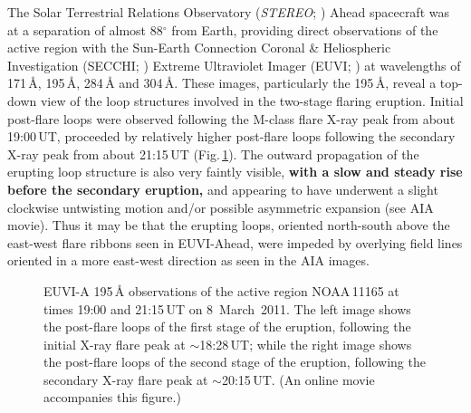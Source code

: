 \documentclass[namedreferences]{solarphysics}
\begin{document}
\begin{article}
The Solar Terrestrial Relations Observatory (\emph{STEREO}; ) Ahead spacecraft was at a separation of almost 88$^{\circ}$ from Earth, providing direct observations of the active region with the Sun-Earth Connection Coronal \& Heliospheric Investigation (SECCHI; ) Extreme Ultraviolet Imager (EUVI; ) at wavelengths of 171\,{\AA}, 195\,{\AA}, 284\,{\AA} and 304\,{\AA}. These images, particularly the 195\,{\AA}, reveal a top-down view of the loop structures involved in the two-stage flaring eruption. Initial post-flare loops were observed following the M-class flare X-ray peak from about 19:00\,UT, proceeded by relatively higher post-flare loops following the secondary X-ray peak from about 21:15\,UT (Fig.\,\ref{euvi}). The outward propagation of the erupting loop structure is also very faintly visible, {\bf with a slow and steady rise before the secondary eruption,} and appearing to have underwent a slight clockwise untwisting motion and/or possible asymmetric expansion (see AIA movie). Thus it may be that the erupting loops, oriented north-south above the east-west flare ribbons seen in EUVI-Ahead, were impeded by overlying field lines oriented in a more east-west direction as seen in the AIA images.

\begin{figure}[!t]
\caption{EUVI-A 195\,{\AA} observations of the active region NOAA\,11165 at times 19:00 and 21:15\,UT on 8~March~2011. The left image shows the post-flare loops of the first stage of the eruption, following the initial X-ray flare peak at $\sim$18:28\,UT; while the right image shows the post-flare loops of the second stage of the eruption, following the secondary X-ray flare peak at $\sim$20:15\,UT. (An online movie accompanies this figure.)}
\label{euvi}
\end{figure}


\end{article}
\end{document}
